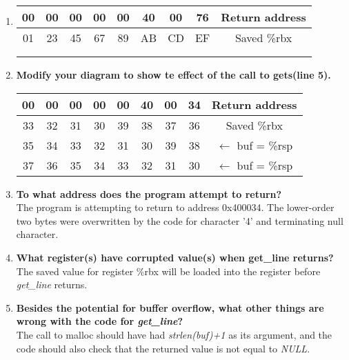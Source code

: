 \documentclass{article}
\begin{document}
\begin{enumerate}[label=\textbf{\Alph*.}]
	\item
\begin{tabular}{|c c c c c c c c| c}
	\hline
	00 & 00 & 00 & 00 & 00 & 40 & 00 & 76 & Return address \\
	\hline
	01 & 23 & 45 & 67 & 89 & AB & CD & EF & Saved \%rbx \\
	\hline
	&&&&&&&&\\
	\hline
	&&&&&&&&\\
	\hline
\end{tabular}
	\item \textbf{Modify your diagram to show te effect of the call to gets(line 5).}
\begin{tabular}{|c c c c c c c c| c}
	\hline
	00 & 00 & 00 & 00 & 00 & 40 & 00 & 34 & Return address \\
	\hline
	33 & 32 & 31 & 30 & 39 & 38 & 37 & 36 & Saved \%rbx \\
	\hline
	35 & 34 & 33 & 32 & 31 & 30 & 39 & 38 & $\leftarrow$ buf = \%rsp \\
	\hline
	37 & 36 & 35 & 34 & 33 & 32 & 31 & 30 & $\leftarrow$ buf = \%rsp \\
	\hline
\end{tabular}
	\item \textbf{To what address does the program attempt to return?} \\
	The program is attempting to return to address 0x400034. The lower-order two bytes
	were overwritten by the code for character '4' and terminating null character.
	\item  \textbf{What register(s) have corrupted value(s) when get\_line returns?} \\
	The saved value for register \%rbx will be loaded into the register before
	\textit{get\_line} returns.
	\item \textbf{Besides the potential for buffer overflow, what other things are wrong
	with the code for \textit{get\_line}?} \\
	The call to malloc should have had \textit{strlen(buf)+1} as its argument, and
	the code should also check that the returned value is not equal to \textit{NULL}.
\end{enumerate}
\end{document}
